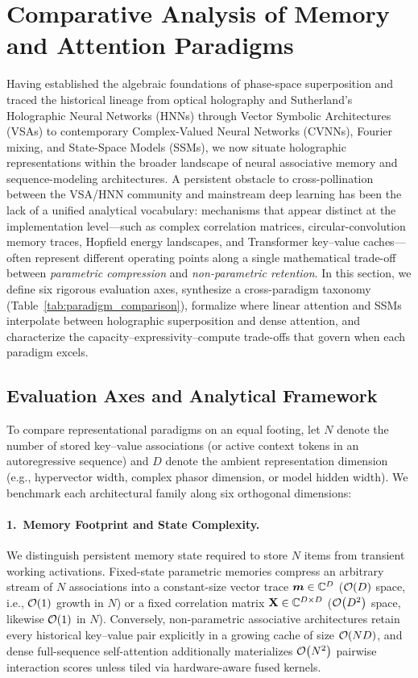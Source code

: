 \section{Comparative Analysis of Memory and Attention Paradigms}\label{sec:comparison}

Having established the algebraic foundations of phase-space superposition and traced the historical lineage from optical holography and Sutherland's Holographic Neural Networks (HNNs) through Vector Symbolic Architectures (VSAs) to contemporary Complex-Valued Neural Networks (CVNNs), Fourier mixing, and State-Space Models (SSMs), we now situate holographic representations within the broader landscape of neural associative memory and sequence-modeling architectures.
A persistent obstacle to cross-pollination between the VSA/HNN community and mainstream deep learning has been the lack of a unified analytical vocabulary: mechanisms that appear distinct at the implementation level---such as complex correlation matrices, circular-convolution memory traces, Hopfield energy landscapes, and Transformer key--value caches---often represent different operating points along a single mathematical trade-off between \emph{parametric compression} and \emph{non-parametric retention}.
In this section, we define six rigorous evaluation axes, synthesize a cross-paradigm taxonomy (Table~\ref{tab:paradigm_comparison}), formalize where linear attention and SSMs interpolate between holographic superposition and dense attention, and characterize the capacity--expressivity--compute trade-offs that govern when each paradigm excels.

\subsection{Evaluation Axes and Analytical Framework}\label{sec:comparison:axes}

To compare representational paradigms on an equal footing, let $N$ denote the number of stored key--value associations (or active context tokens in an autoregressive sequence) and $D$ denote the ambient representation dimension (e.g., hypervector width, complex phasor dimension, or model hidden width).
We benchmark each architectural family along six orthogonal dimensions:

\paragraph{1.\ Memory Footprint and State Complexity.}
We distinguish persistent memory state required to store $N$ items from transient working activations.
Fixed-state parametric memories compress an arbitrary stream of $N$ associations into a constant-size vector trace $\boldsymbol{m} \in \mathbb{C}^D$ ($\mathcal{O}\!\left(D\right)$ space, i.e., $\mathcal{O}\!\left(1\right)$ growth in $N$) or a fixed correlation matrix $\mathbf{X} \in \mathbb{C}^{D \times D}$ ($\mathcal{O}\!\left(D^2\right)$ space, likewise $\mathcal{O}\!\left(1\right)$ in $N$).
Conversely, non-parametric associative architectures retain every historical key--value pair explicitly in a growing cache of size $\mathcal{O}\!\left(ND\right)$, and dense full-sequence self-attention additionally materializes $\mathcal{O}\!\left(N^2\right)$ pairwise interaction scores unless tiled via hardware-aware fused kernels.

